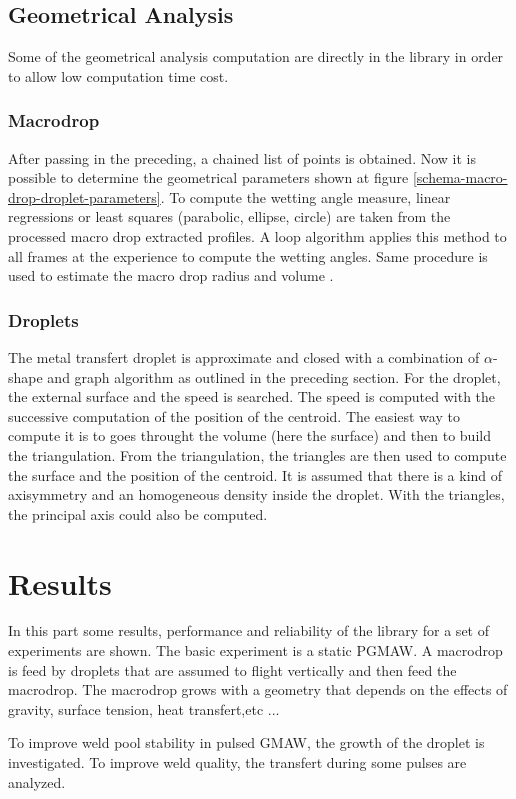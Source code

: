 \documentclass[12pt]{iopart}
\begin{document}
\subsection{Geometrical Analysis}
\label{geometrical_analize}
Some of the geometrical analysis computation are directly in the
library in order to allow low computation time cost.
\subsubsection{Macrodrop}
After passing in the preceding, a chained list of points is obtained.
Now it is possible to determine the geometrical parameters shown 
at figure \ref{schema-macro-drop-droplet-parameters}. To compute the wetting 
angle measure, linear regressions or least squares (parabolic, ellipse, circle) 
are taken from the processed macro drop extracted profiles.
A loop algorithm applies this method to all frames at the experience to compute the wetting 
angles. Same procedure is used to estimate the macro drop radius and volume \cite{CHAPUIS}.
\subsubsection{Droplets}
The metal transfert droplet is approximate and closed with a combination of $\alpha$-shape and
graph algorithm as outlined in the preceding section.
For the droplet, the external surface and the speed is searched.
The speed is computed with the successive computation of the position of the centroid.
The easiest way to compute it is to goes throught the volume (here the surface) and then
to build the triangulation. From the triangulation, the triangles 
are then used to compute the surface and the position of the centroid. It is assumed that there is a kind
of axisymmetry  and an homogeneous density inside the droplet. With the triangles, the principal axis could also be 
computed.


\section{ Results}
In this part some results, performance and reliability of the library for a set of experiments
are shown. The basic experiment is a static PGMAW.
A macrodrop is feed by droplets that are assumed to flight vertically and
then feed the macrodrop. The macrodrop grows with a geometry that depends on the effects of gravity,
surface tension, heat transfert,etc ...

To improve weld pool stability in pulsed GMAW, the growth of the droplet is investigated.
To improve weld quality, the transfert during some pulses are analyzed.
\end{document}

